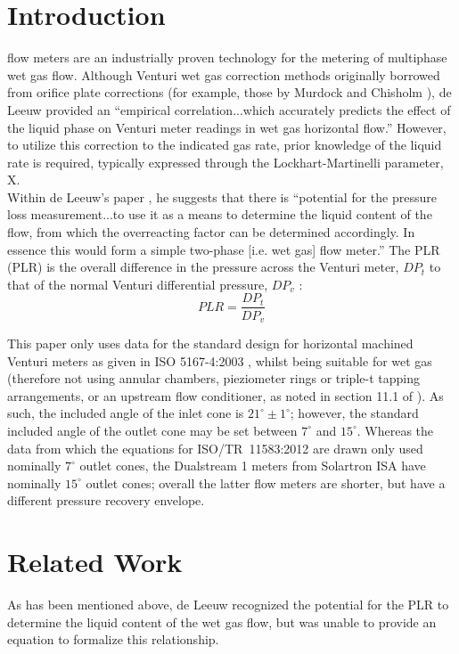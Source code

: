 \documentclass[journal]{IEEEtran}
\begin{document}
\section{Introduction}
 flow meters are an industrially proven technology for the metering of multiphase wet gas flow. Although Venturi wet gas correction methods originally borrowed from orifice plate corrections (for example, those by Murdock \cite{Murdock1962} and Chisholm \cite{Chisholm1977}), de Leeuw \cite{DeLeeuw1997} provided an ``empirical correlation...which accurately predicts the effect of the liquid phase on Venturi meter readings in wet gas horizontal flow.''  However, to utilize this correction to the indicated gas rate, prior knowledge of the liquid rate is required, typically expressed through the Lockhart-Martinelli parameter, \acrshort{X}.\\

Within de Leeuw's paper \cite{DeLeeuw1997}, he suggests that there is ``potential for the pressure loss measurement...to use it as a means to determine the liquid content of the flow, from which the overreacting factor can be determined accordingly. In essence this would form a simple two-phase [i.e. wet gas] flow meter.''  The \acrlong{PLR} (PLR) is the overall difference in the pressure across the Venturi meter, $DP_{t}$ to that of the normal Venturi differential pressure, $DP_{v}$ :
\begin{equation}
    PLR = \frac{DP_{t}}{DP_{v}}
\end{equation}

This paper only uses data for the standard design for horizontal machined Venturi meters as given in ISO 5167-4:2003 \cite{2003ISOTubes}, whilst being suitable for wet gas (therefore not using annular chambers, pieziometer rings or triple-t tapping arrangements, or an upstream flow conditioner, as noted in section 11.1 of \cite{Reader-Harris2015}).  As such, the included angle of the inlet cone is $21^{\circ} \pm 1^{\circ}$; however, the standard included angle of the outlet cone may be set between $7^{\circ}$ and $15^{\circ}$.  Whereas the data from which the equations for ISO/TR~11583:2012 \cite{2012ISO/TRConduits} are drawn only used nominally $7^{\circ}$ outlet cones, the Dualstream 1 meters from Solartron ISA have nominally $15^{\circ}$ outlet cones; overall the latter flow meters are shorter, but have a different pressure recovery envelope.

\section{Related Work}
As has been mentioned above, de Leeuw \cite{DeLeeuw1997} recognized the potential for the \acrshort{PLR} to determine the liquid content of the wet gas flow, but was unable to provide an equation to formalize this relationship.
\end{document}
